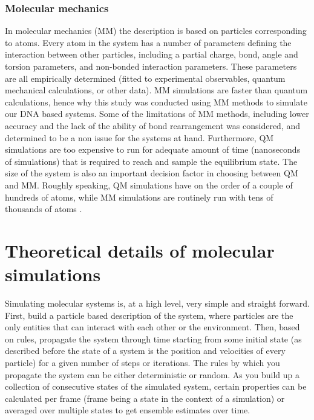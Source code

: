 \documentclass[11pt, a4paper]{report}
\begin{document}
\subsubsection{Molecular mechanics}
\label{sec:mm}

In molecular mechanics (MM) the description is based on particles corresponding to atoms. Every atom in the system has a number of parameters defining the interaction between other particles, including a partial charge, bond, angle and torsion parameters, and non-bonded interaction parameters. These parameters are all empirically determined (fitted to experimental observables, quantum mechanical calculations, or other data). MM simulations are faster than quantum calculations, hence why this study was conducted using MM methods to simulate our DNA based systems. Some of the limitations of MM methods, including lower accuracy and the lack of the ability of bond rearrangement was considered, and determined to be a non issue for the systems at hand. Furthermore, QM simulations are too expensive to run for adequate amount of time (nanoseconds of simulations) that is required to reach and sample the equilibrium state. The size of the system is also an important decision factor in choosing between QM and MM. Roughly speaking, QM simulations have on the order of a couple of hundreds of atoms, while MM simulations are routinely run with tens of thousands of atoms \cite{leach2001molecular, frenkel2001understanding}.

\section{Theoretical details of molecular simulations}

Simulating molecular systems is, at a high level, very simple and straight forward. First, build a particle based description of the system, where particles are the only entities that can interact with each other or the environment. Then, based on rules, propagate the system through time starting from some initial state (as described before the state of a system is the position and velocities of every particle) for a given number of steps or iterations. The rules by which you propagate the system can be either deterministic or random. As you build up a collection of consecutive states of the simulated system, certain properties can be calculated per frame (frame being a state in the context of a simulation) or averaged over multiple states to get ensemble estimates over time. 
\end{document}
